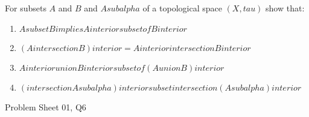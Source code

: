 \begin{samepage}
\begin{ex}
    For subsets $A$ and $B$ and $A sub alpha$ of a topological space $(X, tau)$ show that:
    \begin{enumerate}
        \item $A subset B implies A interior subset of B interior$
        \item $(A intersection B) interior = A interior intersection B interior$
        \item $A interior union B interior subset of (A union B) interior$
        \item $(intersection A sub alpha) interior subset intersection (A sub alpha) interior$
    \end{enumerate}
\end{ex}
\begin{source}
    Problem Sheet 01, Q6
\end{source}
\end{samepage}

